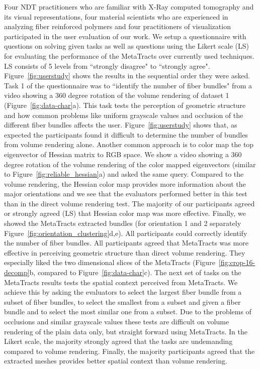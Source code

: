 Four NDT practitioners who are familiar with X-Ray computed tomography and its visual representations, four material scientists who are experienced in analyzing fiber reinforced polymers and four practitioners of visualization participated in the user evaluation of our work. We setup a questionnaire with questions on solving given tasks as well as questions using the Likert scale (LS) for evaluating the performance of the MetaTracts over currently used techniques. LS consists of 5 levels from ``strongly disagree" to ``strongly agree". Figure~\ref{fig:userstudy} shows the results in the sequential order they were asked. Task 1 of the questionnaire was to ``identify the number of fiber bundles" from a video showing a 360 degree rotation of the volume rendering of dataset 1 (Figure~\ref{fig:data-char}a). This task tests the perception of geometric structure and how common problems like uniform grayscale values and occlusion of the different fiber bundles affects the user. Figure~\ref{fig:userstudy} shows that, as expected the participants found it difficult to determine the number of bundles from volume rendering alone. Another common approach is to color map the top eigenvector of Hessian matrix to RGB space. We show a video showing a 360 degree rotation of the volume rendering of the color mapped eigenvectors (similar to Figure~\ref{fig:reliable_hessian}a) and asked the same query. Compared to the volume rendering, the Hessian color map provides more information about the major orientations and we see that the evaluators performed better in this test than in the direct volume rendering test. The majority of our participants agreed or strongly agreed (LS) that Hessian color map was more effective. Finally, we showed the MetaTracts extracted bundles (for orientation 1 and 2 separately Figure~\ref{fig:orientation_clustering}d,e). All participants could correctly identify the number of fiber bundles. All participants agreed that MetaTracts was more effective in perceiving geometric structure than direct volume rendering. They especially liked the two dimensional slices of the MetaTracts (Figure~\ref{fig:crop-16-decomp}b, compared to Figure~\ref{fig:data-char}c).
The next set of tasks on the MetaTracts results tests the spatial context perceived from MetaTracts. We achieve this by asking the evaluators to select the largest fiber bundle from a subset of fiber bundles, to select the smallest from a subset and given a fiber bundle and to select the most similar one from a subset. Due to the problems of occlusions and similar grayscale values these tests are difficult on volume rendering of the plain data only, but straight forward using MetaTracts. In the Likert scale, the majority strongly agreed that the tasks are undemanding compared to volume rendering.
Finally, the majority participants agreed that the extracted meshes provides better spatial context than volume rendering. 
 
